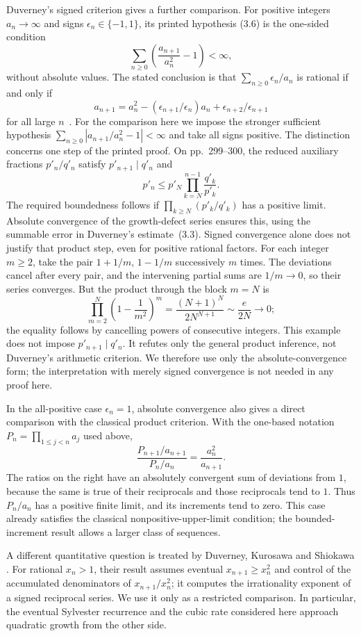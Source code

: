 Duverney's signed criterion gives a further comparison. For positive
integers $a_n\to\infty$ and signs $\epsilon_n\in\{-1,1\}$, its printed
hypothesis (3.6) is the one-sided condition
\[
 \sum_{n\ge0}\left(\frac{a_{n+1}}{a_n^2}-1\right)<\infty,
\]
without absolute values. The stated conclusion is that
$\sum_{n\ge0}\epsilon_n/a_n$ is rational if and only if
\[
 a_{n+1}=a_n^2-(\epsilon_{n+1}/\epsilon_n)a_n
             +\epsilon_{n+2}/\epsilon_{n+1}
\]
for all large $n$~\cite[Corollary~3.2, p.~287]{duverney2001}.
For the comparison here we impose the stronger sufficient hypothesis
$\sum_{n\ge0}|a_{n+1}/a_n^2-1|<\infty$ and take all signs positive.
The distinction concerns one step of the printed proof. On pp.~299--300,
the reduced auxiliary fractions $p'_n/q'_n$ satisfy
$p'_{n+1}\mid q'_n$ and
\[
 p'_n\le p'_N\prod_{k=N}^{n-1}\frac{q'_k}{p'_k}.
\]
The required boundedness follows if
$\prod_{k\ge N}(p'_k/q'_k)$ has a positive limit. Absolute convergence
of the growth-defect series ensures this, using the summable error in
Duverney's estimate~(3.3). Signed convergence alone does not justify
that product step, even for positive rational factors. For each integer
$m\ge2$, take the pair $1+1/m$, $1-1/m$ successively $m$ times.
The deviations cancel after every pair, and the intervening partial sums
are $1/m\to0$, so their series converges. But the product through the
block $m=N$ is
\[
 \prod_{m=2}^{N}\left(1-\frac1{m^2}\right)^m
 =\frac{(N+1)^N}{2N^{N+1}}\sim\frac e{2N}\longrightarrow0;
\]
the equality follows by cancelling powers of consecutive integers.
This example does not impose $p'_{n+1}\mid q'_n$. It refutes only the
general product inference, not Duverney's arithmetic criterion.
We therefore use only the absolute-convergence form; the interpretation
with merely signed convergence is not needed in any proof here.

In the all-positive case $\epsilon_n=1$, absolute convergence also gives a
direct comparison with the classical product criterion. With the
one-based notation $P_n=\prod_{1\le j<n}a_j$ used above,
\[
 \frac{P_{n+1}/a_{n+1}}{P_n/a_n}=\frac{a_n^2}{a_{n+1}}.
\]
The ratios on the right have an absolutely convergent sum of deviations
from $1$, because the same is true of their reciprocals and those
reciprocals tend to $1$. Thus $P_n/a_n$ has a positive finite limit,
and its increments tend to zero. This case already satisfies the
classical nonpositive-upper-limit condition; the bounded-increment
result allows a larger class of sequences.

A different quantitative question is treated by Duverney, Kurosawa and
Shiokawa \cite[Theorem~1, author-version p.~2; proof in Section~3]{duverneykurosawashiokawa2020}.
For rational $x_n>1$, their result assumes eventual $x_{n+1}\ge x_n^2$
and control of the accumulated denominators of $x_{n+1}/x_n^2$; it computes
the irrationality exponent of a signed reciprocal series. We use it only as
a restricted comparison. In particular, the eventual Sylvester recurrence and the cubic rate
considered here approach quadratic growth from the other side.


